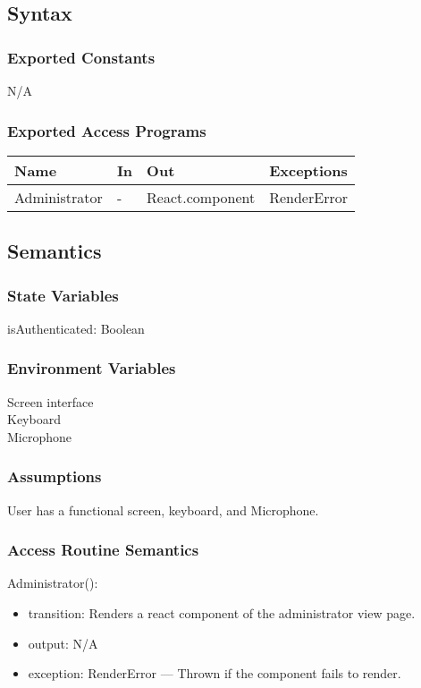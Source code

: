 \documentclass[12pt, titlepage]{article}
\begin{document}
\subsection{Syntax}

\subsubsection{Exported Constants}
N/A

\subsubsection{Exported Access Programs}

\begin{center}
\begin{tabular}{p{3cm} p{2cm} p{4cm} p{3cm}}
\hline
\textbf{Name} & \textbf{In} & \textbf{Out} & \textbf{Exceptions} \\
\hline
Administrator & - & React.component &  RenderError\\
\hline
\end{tabular}
\end{center}

\subsection{Semantics}

\subsubsection{State Variables}
isAuthenticated: Boolean

\subsubsection{Environment Variables}
Screen interface\\
Keyboard\\
Microphone

\subsubsection{Assumptions}
User has a functional screen, keyboard, and Microphone.

\subsubsection{Access Routine Semantics}

\noindent Administrator():
\begin{itemize}
\item transition: Renders a react component of the administrator view page.
\item output: N/A
\item exception: RenderError — Thrown if the component fails to render.
\end{itemize}
\end{document}
